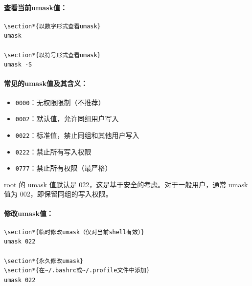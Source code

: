 \documentclass[12pt,UTF8]{ctexbook}
\begin{document}
\paragraph{查看当前umask值：}
\begin{verbatim}
\section*{以数字形式查看umask}
umask

\section*{以符号形式查看umask}
umask -S
\end{verbatim}

\paragraph{常见的umask值及其含义：}
\begin{itemize}
    \item \verb+0000+：无权限限制（不推荐）
    \item \verb+0002+：默认值，允许同组用户写入
    \item \verb+0022+：标准值，禁止同组和其他用户写入
    \item \verb+0222+：禁止所有写入权限
    \item \verb+0777+：禁止所有权限（最严格）
\end{itemize}

root 的 umask 值默认是 022，这是基于安全的考虑。对于一般用户，通常 umask 值为 002，即保留同组的写入权限。

\paragraph{修改umask值：}
\begin{verbatim}
\section*{临时修改umask（仅对当前shell有效）}
umask 022

\section*{永久修改umask}
\section*{在~/.bashrc或~/.profile文件中添加}
umask 022
\end{verbatim}
\end{document}
